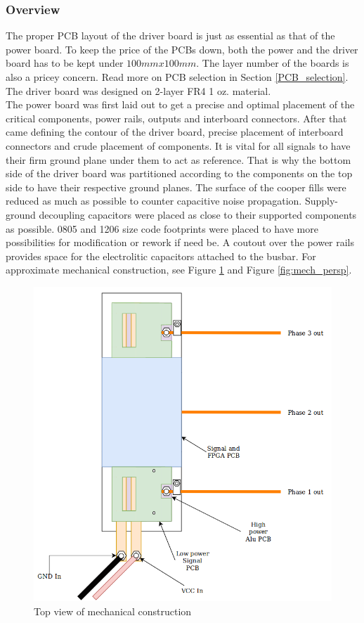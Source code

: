 \subsubsection{Overview}

The proper PCB layout of the driver board is just as essential as that of the power board. To keep the price of the PCBs down, both the power and the driver board has to be kept under $100mm x 100mm$. The layer number of the boards is also a pricey concern. Read more on PCB selection in Section \ref{PCB_selection}. The driver board was designed on 2-layer FR4 1 oz. material. \\

The power board was first laid out to get a precise and optimal placement of the critical components, power rails, outputs and interboard connectors. After that came defining the contour of the driver board, precise placement of interboard connectors and crude placement of components. It is vital for all signals to have their firm ground plane under them to act as reference. That is why the bottom side of the driver board was partitioned according to the components on the top side to have their respective ground planes. The surface of the cooper fills were reduced as much as possible to counter capacitive noise propagation. Supply-ground decoupling capacitors were placed as close to their supported components as possible. 0805 and 1206 size code footprints were placed to have more possibilities for modification or rework if need be. A coutout over the power rails provides space for the electrolitic capacitors attached to the busbar. For approximate mechanical construction, see Figure \ref{fig:mech_top} and Figure \ref{fig:mech_persp}.

\begin{figure}[H]
	\centering
	\includegraphics[width=1\textwidth]{pictures/hardware/Power_Board/mechanical_top_new.png}
	\caption{Top view of mechanical construction}
	\label{fig:mech_top}
\end{figure}

